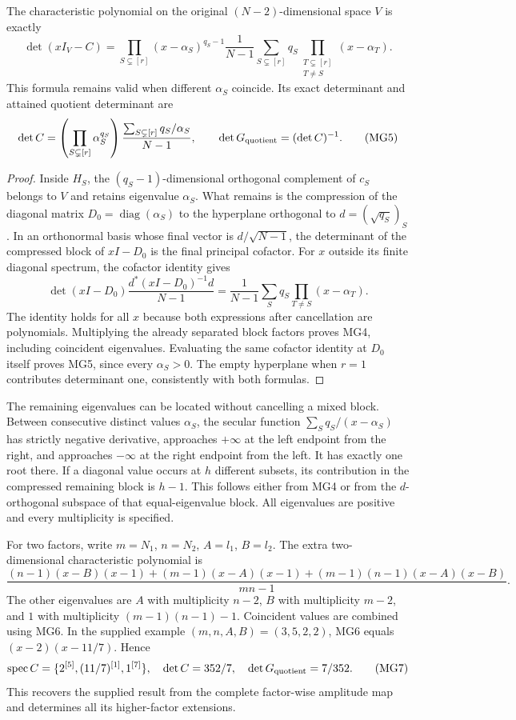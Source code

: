 \begin{theorem}
The characteristic polynomial on the original $(N-2)$-dimensional
space $V$ is exactly
\[
 \det(xI_V-C)=
 \prod_{S\subsetneq[r]}(x-\alpha_S)^{q_S-1}
 \frac{1}{N-1}
 \sum_{S\subsetneq[r]}q_S
       \prod_{\substack{T\subsetneq[r]\\T\ne S}}(x-\alpha_T).
 \tag{MG4}\label{mg:polynomial}
\]
This formula remains valid when different $\alpha_S$ coincide.
Its exact determinant and attained quotient determinant are
\[
 \det C=
 \left(\prod_{S\subsetneq[r]}\alpha_S^{q_S}\right)
 \frac{\sum_{S\subsetneq[r]}q_S/\alpha_S}{N-1},
 \qquad \det G_{\rm quotient}=(\det C)^{-1}.
 \tag{MG5}\label{mg:determinant}
\]
\end{theorem}
\begin{proof}
Inside $H_S$, the $(q_S-1)$-dimensional orthogonal complement of
$c_S$ belongs to $V$ and retains eigenvalue $\alpha_S$. What remains
is the compression of the diagonal matrix
$D_0=\operatorname{diag}(\alpha_S)$ to the hyperplane orthogonal
to $d=(\sqrt{q_S})_S$. In an orthonormal basis whose final vector
is $d/\sqrt{N-1}$, the determinant of the compressed block of
$xI-D_0$ is the final principal cofactor. For $x$ outside its
finite diagonal spectrum, the cofactor identity gives
\[
 \det(xI-D_0)\frac{d^*(xI-D_0)^{-1}d}{N-1}
 =\frac1{N-1}\sum_Sq_S\prod_{T\ne S}(x-\alpha_T).
\]
The identity holds for all $x$ because both expressions after
cancellation are polynomials. Multiplying the already separated
block factors proves MG4, including coincident eigenvalues.
Evaluating the same cofactor identity at $D_0$ itself proves
MG5, since every $\alpha_S>0$. The empty hyperplane when $r=1$
contributes determinant one, consistently with both formulas.
\end{proof}

The remaining eigenvalues can be located without cancelling a
mixed block. Between consecutive distinct values $\alpha_S$, the
secular function $\sum_Sq_S/(x-\alpha_S)$ has strictly negative
derivative, approaches $+\infty$ at the left endpoint from the
right, and approaches $-\infty$ at the right endpoint from the
left. It has exactly one root there. If a diagonal value occurs
at $h$ different subsets, its contribution in the compressed
remaining block is $h-1$. This follows either from MG4 or from
the $d$-orthogonal subspace of that equal-eigenvalue block.
All eigenvalues are positive and every multiplicity is specified.

For two factors, write $m=N_1$, $n=N_2$, $A=l_1$, $B=l_2$.
The extra two-dimensional characteristic polynomial is
\[
 \frac{(n-1)(x-B)(x-1)+(m-1)(x-A)(x-1)
 +(m-1)(n-1)(x-A)(x-B)}{mn-1}.
 \tag{MG6}\label{mg:two-factor}
\]
The other eigenvalues are $A$ with multiplicity $n-2$, $B$ with
multiplicity $m-2$, and $1$ with multiplicity
$(m-1)(n-1)-1$. Coincident values are combined using MG6.
In the supplied example $(m,n,A,B)=(3,5,2,2)$, MG6 equals
$(x-2)(x-11/7)$. Hence
\[
 \operatorname{spec}C=\{2^{[5]},(11/7)^{[1]},1^{[7]}\},
 \quad \det C=352/7,\quad\det G_{\rm quotient}=7/352.
 \tag{MG7}\label{mg:example}
\]
This recovers the supplied result from the complete factor-wise
amplitude map and determines all its higher-factor extensions.

